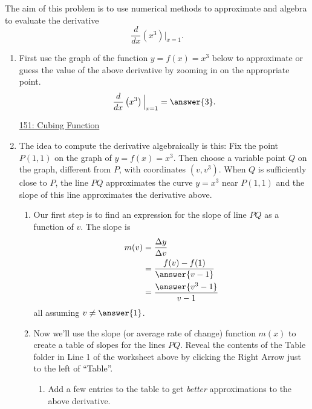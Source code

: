 \documentclass{ximera}
\begin{document}
\begin{exploration}   \label{Exp9039000030}
The aim of this problem is to use numerical methods to approximate and algebra to evaluate the derivative
\[
   \frac{d}{dx}\left( x^3 \right) \Big|_{x=1}.
\]

\begin{enumerate}

\item First use the graph of the function $y=f(x)=x^3$ below to approximate or guess the value of the above derivative by zooming in on the appropriate point.
\[
      \frac{d}{dx}\left( x^3 \right)\Big|_{x=1} = \answer{3} .
\]


\begin{onlineOnly}
    \begin{center}
\end{center}
\end{onlineOnly}

\href{https://www.desmos.com/calculator/6cqyorfc2f}{151: Cubing Function}

\item The idea to compute the derivative algebraically is this: Fix the point $P(1,1)$ on the graph of $y=f(x)=x^3$. Then choose a variable point $Q$ on the graph, different from $P$, with coordinates $(v,v^3)$. When $Q$ is sufficiently close to $P$, the line $PQ$ approximates the curve $y=x^3$ near $P(1,1)$ and the slope of this line approximates the derivative above. 

\begin{enumerate}
\item Our first step is to find an expression for the slope of line $PQ$ as a function of $v$. The slope is
\begin{align*}
        m(v) &= \frac{\Delta y}{\Delta v}  \\
                & = \frac{f(v) - f(1)}{\answer{v-1}} \\
                & = \frac{\answer{v^3-1}}{v-1} \\
\end{align*}
all assuming $v\neq \answer{1}$.

\item Now we'll use the slope (or average rate of change) function $m(x)$ to create a table of slopes for the lines $PQ$. Reveal the contents of the Table folder in Line 1 of the worksheet above by clicking the Right Arrow just to the left of ``Table''. 

\begin{enumerate}
\item Add a few entries to the table to get \emph{better} approximations to the above derivative. 


\end{enumerate}
\end{enumerate}
\end{enumerate}
\end{exploration}
\end{document}
